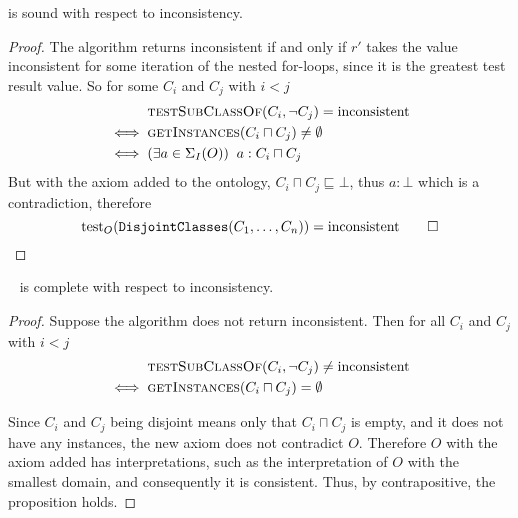 \documentclass[paper.tex]{subfiles}
\begin{document}
\begin{proposition}
  \label{prop:testDisjointClassesInconsistentSound}
   is sound with respect to inconsistency.
\end{proposition}
\begin{proof}
  The algorithm returns inconsistent if and only if $r'$ takes the value inconsistent for some iteration of the nested for-loops, since it is the greatest test result value.  So for some $C_i$ and $C_j$ with $i < j$
  \begin{align*}
    & \Call{testSubClassOf}{C_i, \neg C_j} = \inconsistent \\
    \iff{}& \Call{getInstances}{C_i \sqcap C_j} \ne \emptyset \\
    \iff{}& (\exists a \in \signatureI(O)) \;\; a : C_i \sqcap C_j
  \end{align*}
  But with the axiom added to the ontology, $C_i \sqcap C_j \sqsubseteq \bot$, thus $a : \bot$ which is a contradiction, therefore
  \[ \operatorname{test}_O(\mathtt{DisjointClasses}(C_1, \ldots, C_n)) = \mathrm{inconsistent} \qed \]
\end{proof}

\begin{proposition}
  \sloppy~
   is complete with respect to inconsistency.
\end{proposition}
\begin{proof}
  Suppose the algorithm does not return inconsistent.  Then for all $C_i$ and $C_j$ with $i < j$
  \begin{align*}
    & \Call{testSubClassOf}{C_i, \neg C_j} \ne \inconsistent \\
    \iff{}& \Call{getInstances}{C_i \sqcap C_j} = \emptyset
  \end{align*}

  Since $C_i$ and $C_j$ being disjoint means only that $C_i \sqcap C_j$ is empty, and it does not have any instances, the new axiom does not contradict $O$.  Therefore $O$ with the axiom added has interpretations, such as the interpretation of $O$ with the smallest domain, and consequently it is consistent.  Thus, by contrapositive, the proposition holds.
\end{proof}
\end{document}
